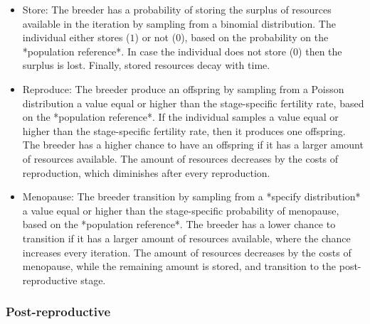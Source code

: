 \documentclass{article}
\begin{document}
\begin{itemize}
    \item Store: The breeder has a probability of storing the surplus of resources available in the iteration by sampling from a binomial distribution. The individual either stores ($1$) or not ($0$), based on the probability on the *population reference*. In case the individual does not store ($0$) then the surplus is lost. Finally, stored resources decay with time.
   \item Reproduce: The breeder produce an offspring by sampling from a Poisson distribution a value equal or higher than the stage-specific fertility rate, based on the *population reference*. If the individual samples a value equal or higher than the stage-specific fertility rate, then it produces one offspring. The breeder has a higher chance to have an offspring if it has a larger amount of resources available. The amount of resources decreases by the costs of reproduction, which diminishes after every reproduction.
    \item Menopause: The breeder transition by sampling from a *specify distribution* a value equal or higher than the stage-specific probability of menopause, based on the *population reference*. The breeder has a lower chance to transition if it has a larger amount of resources available, where the chance increases every iteration. The amount of resources decreases by the costs of menopause, while the remaining amount is stored, and transition to the post-reproductive stage.
\end{itemize}

\subsubsection{Post-reproductive}
\end{document}
